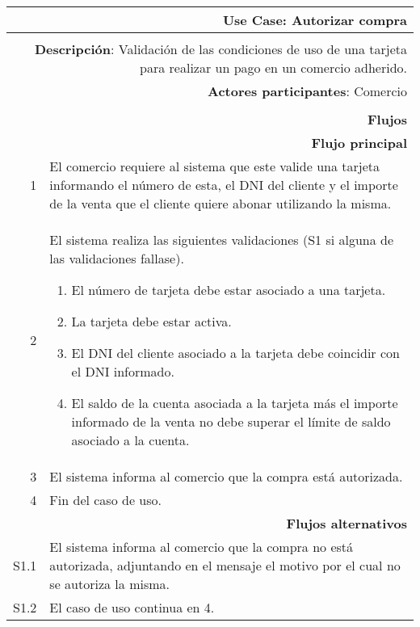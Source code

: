 \begin{tabularx}{\textwidth}{| r | X |}
\hline
\multicolumn{2}{|X|}{
\textbf{Use Case}: Autorizar compra} \\

\hline
\multicolumn{2}{|c|}{\cellcolor[gray]{0.6}} \\

\hline
\multicolumn{2}{|X|}{
\textbf{Descripción}: Validación de las condiciones de uso de una tarjeta para
realizar un pago en un comercio adherido.} \\

\hline
\multicolumn{2}{|X|}{
\textbf{Actores participantes}: Comercio} \\

\hline
\multicolumn{2}{|c|}{\cellcolor[gray]{0.6} } \\

\hline
\multicolumn{2}{|X|}{
\textbf{Flujos}} \\

\hline
\multicolumn{2}{|X|}{
\textbf{Flujo principal}} \\

\hline
1 & El comercio requiere al sistema que este valide una tarjeta informando el
número de esta, el DNI del cliente y el importe de la venta que el cliente
quiere abonar utilizando la misma. \\
\hline
2 & El sistema realiza las siguientes validaciones (S1 si alguna de las
validaciones fallase). 
\begin{enumerate}
\item El número de tarjeta debe estar asociado a una tarjeta.
\item La tarjeta debe estar activa.
\item El DNI del cliente asociado a la tarjeta debe coincidir con el DNI
informado.
\item El saldo de la cuenta asociada a la tarjeta más el importe informado de
la venta no debe superar el límite de saldo asociado a la cuenta.
\end{enumerate} \\
\hline
3 & El sistema informa al comercio que la compra está autorizada. \\
\hline
4 & Fin del caso de uso. \\

\hline
\multicolumn{2}{|X|}{
\textbf{Flujos alternativos}} \\

\hline
S1.1 & El sistema informa al comercio que la compra no está autorizada,
adjuntando en el mensaje el motivo por el cual no se autoriza la misma. \\
\hline
S1.2 & El caso de uso continua en 4. \\

\hline
\end{tabularx}

